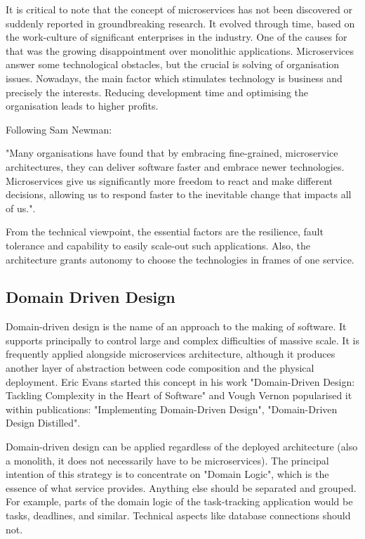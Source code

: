It is critical to note that the concept of microservices has not been discovered or suddenly reported in groundbreaking research. It evolved through time, based on the work-culture of significant enterprises in the industry\cite{building-microservices}. One of the causes for that was the growing disappointment over monolithic applications. Microservices answer some technological obstacles, but the crucial is solving of organisation issues. Nowadays, the main factor which stimulates technology is business and precisely the interests. Reducing development time and optimising the organisation leads to higher profits. 

Following Sam Newman:
\begin{displayquote}
"Many organisations have found that by embracing fine-grained, microservice architectures, they can deliver software faster and embrace newer technologies. Microservices give us significantly more freedom to react and make different decisions, allowing us to respond faster to the inevitable change that impacts all of us."\cite{building-microservices}.
\end{displayquote}

From the technical viewpoint, the essential factors are the resilience, fault tolerance and capability to easily scale-out such applications. Also, the architecture grants autonomy to choose the technologies in frames of one service.

\subsection{Domain Driven Design}
\label{subsec:ddd}

Domain-driven design is the name of an approach to the making of software. It supports principally to control large and complex difficulties of massive scale. It is frequently applied alongside microservices architecture, although it produces another layer of abstraction between code composition and the physical deployment. Eric Evans started this concept in his work "Domain-Driven Design: Tackling Complexity in the Heart of Software" \cite{dddEvans} and Vough Vernon popularised it within publications: "Implementing Domain-Driven Design"\cite{implementingDDD}, "Domain-Driven Design Distilled"\cite{DDD}.

Domain-driven design can be applied regardless of the deployed architecture (also a monolith, it does not necessarily have to be microservices). The principal intention of this strategy is to concentrate on "Domain Logic", which is the essence of what service provides. Anything else should be separated and grouped. For example, parts of the domain logic of the task-tracking application would be tasks, deadlines, and similar.  Technical aspects like database connections should not. 


